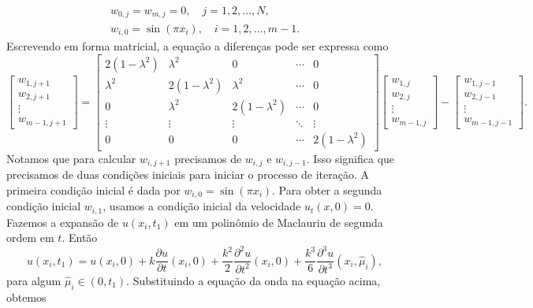 \documentclass[11pt]{article}
\begin{document}
\begin{gather}
    w_{0, j} = w_{m, j} = 0, \quad j = 1, 2, \ldots, N, \\
    w_{i, 0} = \sin(\pi x_i), \quad i = 1, 2, \ldots, m-1. 
\end{gather} Escrevendo em forma matricial, a equação a diferenças pode ser expressa como
\begin{equation}
    \begin{bmatrix}
        w_{1, j+1} \\
        w_{2, j+1} \\
        \vdots \\
        w_{m-1, j+1}
    \end{bmatrix} =
    \begin{bmatrix}
        2(1 - \lambda^2) & \lambda^2 & 0 & \cdots & 0 \\
        \lambda^2 & 2(1 - \lambda^2) & \lambda^2 & \cdots & 0 \\
        0 & \lambda^2 & 2(1 - \lambda^2) & \cdots & 0 \\
        \vdots & \vdots & \vdots & \ddots & \vdots \\
        0 & 0 & 0 & \cdots & 2(1 - \lambda^2)
    \end{bmatrix}
    \begin{bmatrix}
        w_{1, j} \\
        w_{2, j} \\
        \vdots \\
        w_{m-1, j}
    \end{bmatrix} -
    \begin{bmatrix}
        w_{1, j-1} \\
        w_{2, j-1} \\
        \vdots \\
        w_{m-1, j-1}
    \end{bmatrix}.
\end{equation} Notamos que para calcular \(w_{i, j+1}\) precisamos de \(w_{i, j}\) e \(w_{i, j-1}\). Isso significa que precisamos de duas condições iniciais para iniciar o processo de iteração. A primeira condição inicial é dada por \(w_{i, 0} = \sin(\pi x_i)\). Para obter a segunda condição inicial \(w_{i, 1}\), usamos a condição inicial da velocidade \(u_t(x,0) = 0\). Fazemos a expansão de \(u(x_i, t_1)\) em um polinômio de Maclaurin de segunda ordem em \(t\). Então
\begin{equation}
    u(x_i, t_1) = u(x_i, 0) + k \frac{\partial u}{\partial t}(x_i, 0) + \frac{k^2}{2} \frac{\partial^2 u}{\partial t^2}(x_i, 0) + \frac{k^3}{6} \frac{\partial^3 u}{\partial t^3}(x_i, \hat{\mu}_i),
\end{equation} para algum \(\hat{\mu}_i \in (0, t_1)\). Substituindo a equação da onda na equação acima, obtemos
\end{document}
